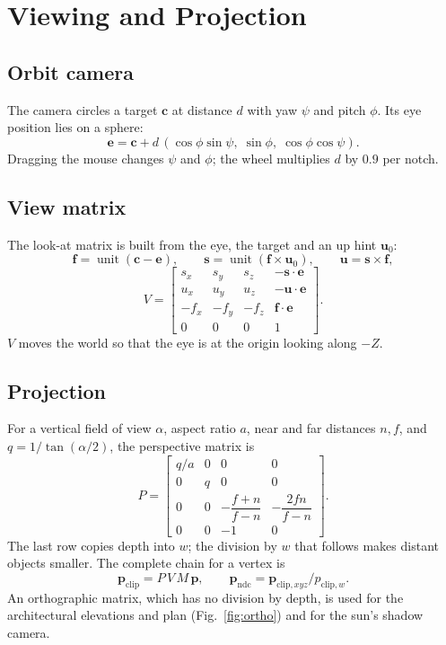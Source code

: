 \documentclass[11pt,a4paper]{article}
\newcommand{\vect}[1]{\mathbf{#1}}
\newcommand{\unit}[1]{\operatorname{unit}\!\left(#1\right)}
\begin{document}
\section{Viewing and Projection}\label{sec:camera}
\subsection{Orbit camera}
The camera circles a target $\vect c$ at distance $d$ with yaw $\psi$ and
pitch $\phi$. Its eye position lies on a sphere:
\begin{equation}
\vect e=\vect c+d\,(\cos\phi\sin\psi,\;\sin\phi,\;\cos\phi\cos\psi).
\end{equation}
Dragging the mouse changes $\psi$ and $\phi$; the wheel multiplies $d$ by
$0.9$ per notch.

\subsection{View matrix}
The look-at matrix is built from the eye, the target and an up hint $\vect u_0$:
\begin{equation}
\vect f=\unit{\vect c-\vect e},\qquad
\vect s=\unit{\vect f\times\vect u_0},\qquad
\vect u=\vect s\times\vect f,
\end{equation}
\begin{equation}
V=\begin{bmatrix}
s_x&s_y&s_z&-\vect s\cdot\vect e\\
u_x&u_y&u_z&-\vect u\cdot\vect e\\
-f_x&-f_y&-f_z&\vect f\cdot\vect e\\
0&0&0&1\end{bmatrix}.
\end{equation}
$V$ moves the world so that the eye is at the origin looking along $-Z$.

\subsection{Projection}
For a vertical field of view $\alpha$, aspect ratio $a$, near and far
distances $n,f$, and $q=1/\tan(\alpha/2)$, the perspective matrix is
\begin{equation}
P=\begin{bmatrix}
q/a&0&0&0\\0&q&0&0\\
0&0&-\dfrac{f+n}{f-n}&-\dfrac{2fn}{f-n}\\
0&0&-1&0\end{bmatrix}.
\end{equation}
The last row copies depth into $w$; the division by $w$ that follows makes
distant objects smaller. The complete chain for a vertex is
\begin{equation}
\vect p_{\mathrm{clip}}=P\,V\,M\,\vect p,\qquad
\vect p_{\mathrm{ndc}}=\vect p_{\mathrm{clip},xyz}/p_{\mathrm{clip},w}.
\end{equation}
An orthographic matrix, which has no division by depth, is used for the
architectural elevations and plan (Fig.~\ref{fig:ortho}) and for the sun's
shadow camera.
\end{document}
